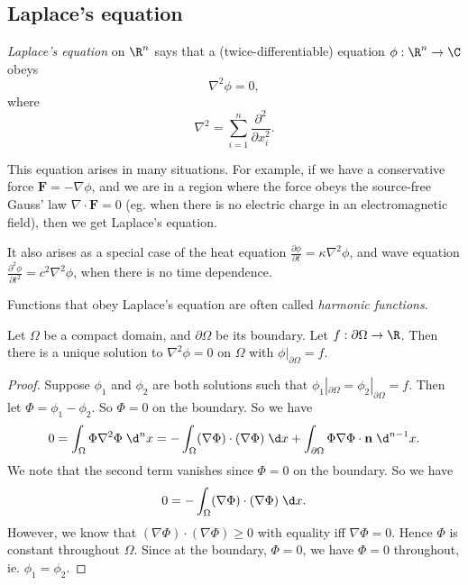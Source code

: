 \documentclass[a4paper]{article}
\begin{document}
\subsection{Laplace's equation}
\begin{defi}
  \emph{Laplace's equation} on $\R^n$ says that a (twice-differentiable) equation $\phi: \R^n \to \C$ obeys
  \[
    \nabla^2 \phi = 0,
  \]
  where
  \[
    \nabla^2 = \sum_{i = 1}^n \frac{\partial^2}{\partial x_i^2}.
  \]
\end{defi}
This equation arises in many situations. For example, if we have a conservative force $\mathbf{F} = -\nabla \phi$, and we are in a region where the force obeys the source-free Gauss' law $\nabla\cdot \mathbf{F} = 0$ (eg. when there is no electric charge in an electromagnetic field), then we get Laplace's equation.

It also arises as a special case of the heat equation $\frac{\partial \phi}{\partial t} = \kappa \nabla^2 \phi$, and wave equation $\frac{\partial^2 \phi}{\partial t^2} = c^2 \nabla^2 \phi$, when there is no time dependence.

\begin{defi}
  Functions that obey Laplace's equation are often called \emph{harmonic functions}.
\end{defi}

\begin{prop}
  Let $\Omega$ be a compact domain, and $\partial \Omega$ be its boundary. Let $ f: \partial \Omega\to \R$. Then there is a unique solution to $\nabla^2 \phi = 0$ on $\Omega$ with $\phi|_{\partial \Omega} = f$.
\end{prop}

\begin{proof}
  Suppose $\phi_1$ and $\phi_2$ are both solutions such that $\phi_1|_{\partial \Omega} = \phi_2|_{\partial \Omega} = f$. Then let $\Phi = \phi_1 - \phi_2$. So $\Phi = 0$ on the boundary. So we have
  \[
    0 = \int_\Omega \Phi \nabla^2 \Phi \;\d^n x = -\int_\Omega (\nabla \Phi) \cdot (\nabla \Phi)\;\d x + \int_{\partial \Omega} \Phi \nabla \Phi\cdot \mathbf{n} \;\d^{n -1 }x.
  \]
  We note that the second term vanishes since $\Phi = 0$ on the boundary. So we have
  \[
    0 = -\int_\Omega (\nabla \Phi) \cdot (\nabla \Phi)\;\d x.
  \]
  However, we know that $(\nabla \Phi) \cdot (\nabla \Phi) \geq 0$ with equality iff $\nabla \Phi = 0$. Hence $\Phi$ is constant throughout $\Omega$. Since at the boundary, $\Phi = 0$, we have $\Phi = 0$ throughout, ie. $\phi_1 = \phi_2$.
\end{proof}
\end{document}
